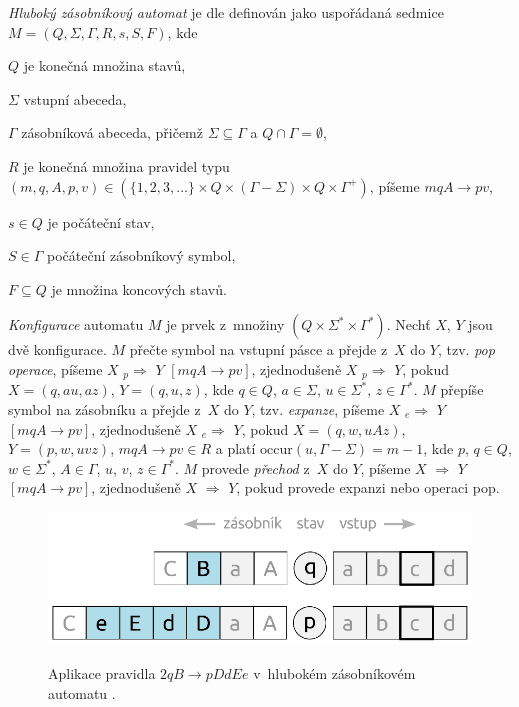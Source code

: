 
\begin{Def} \label{def_deep_pda}
\emph{Hluboký zásobníkový automat} je dle \cite{Meduna:DeepPDA} definován jako uspořádaná sedmice $M = (Q,\Sigma,\Gamma, R, s, S, F)$, kde 

\begin{description*}
\item  $Q$ je konečná množina stavů, 
\item  $\Sigma$ vstupní abeceda, 
\item  $\Gamma$ zásobníková abeceda, přičemž $\Sigma \subseteq \Gamma$ a $Q \cap \Gamma = \emptyset$,
\item  $R$ je konečná množina pravidel typu $(m, q, A, p, v) \in (\{1,2,3,\dots\} \times Q \times (\Gamma-\Sigma)\times   Q \times {\Gamma}^+)$, píšeme $mqA \rightarrow pv$,
\item  $s \in Q$ je počáteční stav, 
\item  $S \in \Gamma$ počáteční zásobníkový symbol, 
\item  $F \subseteq Q$ je množina koncových stavů.
\end{description*}

\emph{Konfigurace} automatu $M$ je prvek z~množiny $(Q \times \Sigma^* \times \Gamma^*)$. 
Nechť $X$, $Y$ jsou dvě konfigurace. 
$M$ přečte symbol na vstupní pásce a přejde z~$X$ do $Y$, tzv. \emph{pop operace}, píšeme $X$  ${}_p{\Rightarrow}$  $Y$ $[mqA \rightarrow pv]$, zjednodušeně $X$  ${}_p{\Rightarrow}$  $Y$, pokud $X = (q, au, az)$, $Y = (q, u, z)$, kde $q \in Q$, $a \in \Sigma$, $u \in \Sigma^*$, $z \in \Gamma^*$.
$M$ přepíše symbol na zásobníku a přejde z~$X$ do $Y$, tzv. \emph{expanze}, píšeme $X$  ${}_e{\Rightarrow}$  $Y$ $[mqA \rightarrow pv]$, zjednodušeně $X$  ${}_e{\Rightarrow}$  $Y$, pokud $X = (q, w, uAz)$, $Y = (p, w, uvz)$, $mqA \rightarrow pv \in R$ a platí $\mathrm{occur}(u,\Gamma - \Sigma) = m - 1 $, kde $p$, $q \in Q$, $w \in \Sigma^*$, $A \in \Gamma$, $u$, $v$, $z \in \Gamma^*$. 
$M$ provede \emph{přechod} z~$X$ do $Y$, píšeme $X$  ${\Rightarrow}$  $Y$ $[mqA \rightarrow pv]$, zjednodušeně $X$  ${\Rightarrow}$  $Y$, pokud provede expanzi nebo operaci pop.


\begin{figure}[ht]
\centering
\includegraphics{img/bp_pda01.eps} \bigskip \\
\caption{Aplikace pravidla $2 q B \rightarrow p DdEe$ v~hlubokém zásobníkovém automatu .}
\end{figure}



\end{Def}

